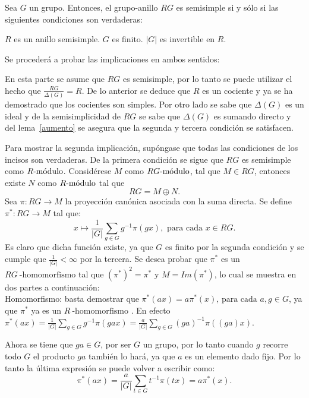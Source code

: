 \begin{teorema}[Maschke]
Sea $G$ un grupo. Entonces, el grupo-anillo $RG$ es semisimple si y sólo si las siguientes condiciones son verdaderas:
\begin{bulletList}
\newItem $R$ es un anillo semisimple.
\newItem $G$ es finito.
\newItem $|G|$ es invertible en $R$.
\end{bulletList}
\end{teorema}
\begin{proof*}
Se procederá a probar las implicaciones en ambos sentidos:
\begin{bulletList}
\newItem En esta parte se asume que $RG$ es semisimple, por lo tanto se puede utilizar el hecho que $\frac{RG}{\Delta (G)} = R$. De lo anterior se deduce que $R$ es un cociente y ya se ha demostrado que los cocientes son simples. Por otro lado se sabe que $\Delta (G)$ es un ideal y de la semisimplicidad de $RG$ se sabe que $\Delta (G)$ es sumando directo y del lema~\ref{aumento} se asegura que la segunda y tercera condición se satisfacen. 

\newItem  Para mostrar la segunda implicación, supóngase que todas las condiciones de los incisos son verdaderas. 
De la primera condición se sigue que $RG$ es semisimple como $\modulo{R}$. Considérese $M$ como $\modulo{RG}$, tal que $M \in RG$, entonces existe $N$ como $\modulo{R}$ tal que 
\[RG = M \oplus N.\]
Sea $\pi\colon RG \to M$ la proyección canónica asociada con la suma directa. Se define $\pi ^ *  \colon RG \to M$ tal que:
\[x \mapsto \frac{1}{|G|}\sum_{g \in G} g^{-1}\pi (gx), \mbox{ para cada } x \in RG. \] 
Es claro que dicha función existe, ya que $G$ es finito por la segunda condición y se cumple que $\frac{1}{|G|} < \infty$ por la tercera. Se desea probar que $\pi ^ * $ es un $RG~\mbox{-homomorfismo}$  tal que $(\pi ^*)^2 = \pi ^* $ y $M = Im(\pi ^*)$, lo cual se muestra en dos partes a continuación:\\
Homomorfismo: basta demostrar que $\pi ^* (ax) = a \pi^*(x) \mbox{, para cada } a, g \in G$, ya que $\pi^* $ ya es un $R~\mbox{-homomorfismo}$ . En efecto $\pi^* (ax) = \frac{1}{|G|} \sum_{g \in G}g^{-1}\pi (gax) = \frac{a}{|G|} \sum_{g \in G}(ga)^{-1}\pi ((ga)x) $.

Ahora se tiene que $ga \in G$, por ser $G$ un grupo, por lo tanto cuando $g$ recorre todo $G$ el producto $ga$ también lo hará, ya que $a$ es un elemento dado fijo. Por lo tanto la última expresión se puede volver a escribir como:
\[\pi^* (ax) = \frac{a}{|G|} \sum_{t \in G}t^{-1}\pi (tx) = a\pi^*(x).\]


\end{bulletList}
\end{proof*}
